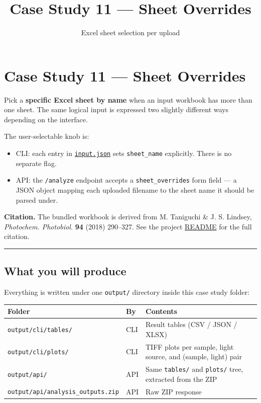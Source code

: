 \documentclass[
  11pt,
]{article}
\title{Case Study 11 — Sheet Overrides}
\subtitle{Excel sheet selection per upload}
\author{}
\date{}
\providecommand{\tightlist}{
  \setlength{\itemsep}{0pt}\setlength{\parskip}{0pt}}
\begin{document}
\maketitle

{
\hypersetup{linkcolor=}
\setcounter{tocdepth}{2}
\tableofcontents
}
\hypertarget{case-study-11--sheet-overrides}{
\section{Case Study 11 --- Sheet
Overrides}\label{case-study-11--sheet-overrides}}

Pick a \textbf{specific Excel sheet by name} when an input workbook has
more than one sheet. The same logical input is expressed two slightly
different ways depending on the interface.

The user-selectable knob is:

\begin{itemize}
\tightlist
\item
  CLI: each entry in
  \href{https://github.com/pinarsyt/overlap-calculator/blob/main/case_studies/11_sheet_overrides/input.json}{\texttt{input.json}}
  sets \texttt{sheet\_name} explicitly. There is no separate flag.
\item
  API: the \texttt{/analyze} endpoint accepts a
  \texttt{sheet\_overrides} form field --- a JSON object mapping each
  uploaded filename to the sheet name it should be parsed under.
\end{itemize}

\textbf{Citation.} The bundled workbook is derived from M. Taniguchi \&
J. S. Lindsey, \emph{Photochem. Photobiol.} \textbf{94} (2018) 290--327.
See the project
\href{https://github.com/pinarsyt/overlap-calculator/blob/main/README.md\#acknowledgement-of-third-party-data}{README}
for the full citation.

\begin{center}\rule{0.5\linewidth}{0.5pt}\end{center}

\hypertarget{what-you-will-produce}{
\subsection{What you will produce}\label{what-you-will-produce}}

Everything is written under one \texttt{output/} directory inside this
case study folder:

\begin{longtable}[]{@{}lll@{}}
\toprule
Folder & By & Contents \\
\midrule
\endhead
\texttt{output/cli/tables/} & CLI & Result tables (CSV / JSON / XLSX) \\
\texttt{output/cli/plots/} & CLI & TIFF plots per sample, light source,
and (sample, light) pair \\
\texttt{output/api/} & API & Same \texttt{tables/} and \texttt{plots/}
tree, extracted from the ZIP \\
\texttt{output/api/analysis\_outputs.zip} & API & Raw ZIP response \\
\bottomrule
\end{longtable}
\end{document}
